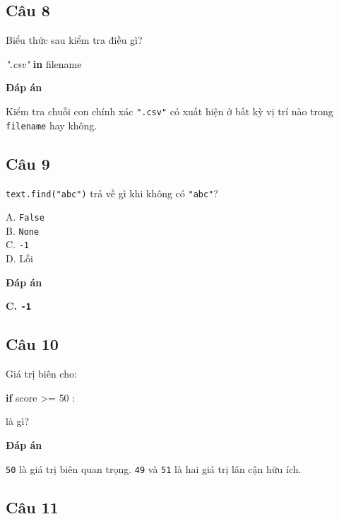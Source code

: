 \documentclass[
  11pt,
  a4paper,
]{article}
\newenvironment{Shaded}{}{}
\newcommand{\CommentTok}[1]{\textcolor[rgb]{0.38,0.63,0.69}{\textit{#1}}}
\newcommand{\ControlFlowTok}[1]{\textcolor[rgb]{0.00,0.44,0.13}{\textbf{#1}}}
\newcommand{\DecValTok}[1]{\textcolor[rgb]{0.25,0.63,0.44}{#1}}
\newcommand{\KeywordTok}[1]{\textcolor[rgb]{0.00,0.44,0.13}{\textbf{#1}}}
\newcommand{\NormalTok}[1]{#1}
\newcommand{\OperatorTok}[1]{\textcolor[rgb]{0.40,0.40,0.40}{#1}}
\begin{document}
\subsection{Câu 8}\label{cuxe2u-8}

Biểu thức sau kiểm tra điều gì?

\begin{Shaded}
\begin{Highlighting}[]
\CommentTok{".csv"} \KeywordTok{in}\NormalTok{ filename}
\end{Highlighting}
\end{Shaded}

\textbf{Đáp án}

Kiểm tra chuỗi con chính xác \texttt{".csv"} có xuất hiện ở bất kỳ vị
trí nào trong \texttt{filename} hay không.

\subsection{Câu 9}\label{cuxe2u-9}

\texttt{text.find("abc")} trả về gì khi không có \texttt{"abc"}?

A. \texttt{False}\\
B. \texttt{None}\\
C. \texttt{-1}\\
D. Lỗi

\textbf{Đáp án}

\textbf{C. \texttt{-1}}

\subsection{Câu 10}\label{cuxe2u-10}

Giá trị biên cho:

\begin{Shaded}
\begin{Highlighting}[]
\ControlFlowTok{if}\NormalTok{ score }\OperatorTok{\textgreater{}=} \DecValTok{50}\NormalTok{ :}
\end{Highlighting}
\end{Shaded}

là gì?

\textbf{Đáp án}

\texttt{50} là giá trị biên quan trọng. \texttt{49} và \texttt{51} là
hai giá trị lân cận hữu ích.

\subsection{Câu 11}\label{cuxe2u-11}
\end{document}
